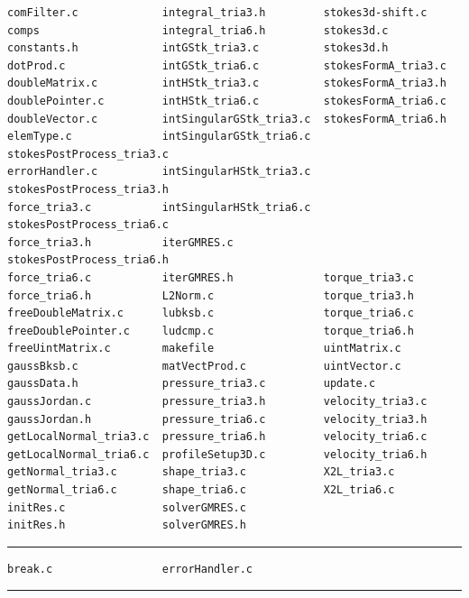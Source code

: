 \documentclass[12pt]{article}
\begin{document}
\small\begin{verbatim}
comFilter.c             integral_tria3.h         stokes3d-shift.c
comps                   integral_tria6.h         stokes3d.c
constants.h             intGStk_tria3.c          stokes3d.h
dotProd.c               intGStk_tria6.c          stokesFormA_tria3.c
doubleMatrix.c          intHStk_tria3.c          stokesFormA_tria3.h
doublePointer.c         intHStk_tria6.c          stokesFormA_tria6.c
doubleVector.c          intSingularGStk_tria3.c  stokesFormA_tria6.h
elemType.c              intSingularGStk_tria6.c  stokesPostProcess_tria3.c
errorHandler.c          intSingularHStk_tria3.c  stokesPostProcess_tria3.h
force_tria3.c           intSingularHStk_tria6.c  stokesPostProcess_tria6.c
force_tria3.h           iterGMRES.c              stokesPostProcess_tria6.h
force_tria6.c           iterGMRES.h              torque_tria3.c
force_tria6.h           L2Norm.c                 torque_tria3.h
freeDoubleMatrix.c      lubksb.c                 torque_tria6.c
freeDoublePointer.c     ludcmp.c                 torque_tria6.h
freeUintMatrix.c        makefile                 uintMatrix.c
gaussBksb.c             matVectProd.c            uintVector.c
gaussData.h             pressure_tria3.c         update.c
gaussJordan.c           pressure_tria3.h         velocity_tria3.c
gaussJordan.h           pressure_tria6.c         velocity_tria3.h
getLocalNormal_tria3.c  pressure_tria6.h         velocity_tria6.c
getLocalNormal_tria6.c  profileSetup3D.c         velocity_tria6.h
getNormal_tria3.c       shape_tria3.c            X2L_tria3.c
getNormal_tria6.c       shape_tria6.c            X2L_tria6.c
initRes.c               solverGMRES.c
initRes.h               solverGMRES.h
\end{verbatim}\normalsize

\hrule


\small\begin{verbatim}
break.c                 errorHandler.c
\end{verbatim}\normalsize

\hrule

\end{document}
